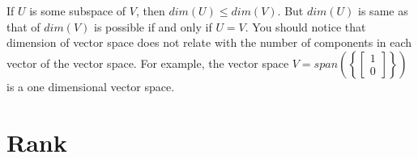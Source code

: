 \documentclass{article}
\begin{document}
If $U$ is some subspace of $V$, then $dim(U)\leq dim(V)$. But $dim(U)$ is same as that of $dim(V)$ is possible if and only if $U=V$. You should notice that dimension of vector space does not relate with the number of components in each vector of the vector space. For example, the vector space $V = span \left (\left \{\begin{bmatrix} 1\\0 \end{bmatrix} \right\} \right )$ is a one dimensional vector space.

\section{Rank}
\end{document}

